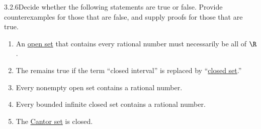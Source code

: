 \begin{exercise}
    {3.2.6}Decide whether the following statements are true or false. Provide counterexamples for those that are false, and supply proofs for those that are true.
    \begin{enumerate}
        \item An \hyperref[def:3.2.2]{open set} that contains every rational number must necessarily be all of \(\R\).
        \item The  remains true if the term ``closed interval'' is replaced by ``\hyperref[def:3.2.5]{closed set}.''
        \item Every nonempty open set contains a rational number.
        \item Every bounded infinite closed set contains a rational number.
        \item The \hyperref[def:3.1.1]{Cantor set} is closed.
    \end{enumerate}
\end{exercise}

